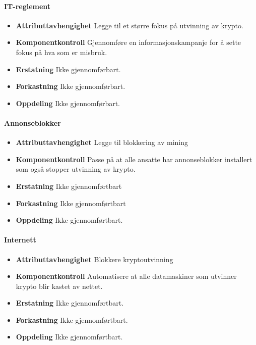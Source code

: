 \paragraph{IT-reglement}
\begin{itemize}
    \item \textbf{Attributtavhengighet} Legge til et større fokus på utvinning av krypto.
    \item \textbf{Komponentkontroll} Gjennomføre en informasjonskampanje for å sette fokus på hva som er misbruk.
    \item \textbf{Erstatning} Ikke gjennomførbart.
    \item \textbf{Forkastning} Ikke gjennomførbart.
    \item \textbf{Oppdeling} Ikke gjennomførbart. 
\end{itemize}

\paragraph{Annonseblokker}
\begin{itemize}
    \item \textbf{Attributtavhengighet} Legge til blokkering av mining 
    \item \textbf{Komponentkontroll} Passe på at alle ansatte har annonseblokker installert som også stopper utvinning av krypto.
    \item \textbf{Erstatning} Ikke gjennomførtbart
    \item \textbf{Forkastning} Ikke gjennomførtbart
    \item \textbf{Oppdeling} Ikke gjennomførtbart.
\end{itemize}

\paragraph{Internett}
\begin{itemize}
    \item \textbf{Attributtavhengighet} Blokkere kryptoutvinning
    \item \textbf{Komponentkontroll} Automatisere at alle datamaskiner som utvinner krypto blir kastet av nettet.
    \item \textbf{Erstatning} Ikke gjennomførtbart.
    \item \textbf{Forkastning} Ikke gjennomførtbart.
    \item \textbf{Oppdeling} Ikke gjennomførtbart.
\end{itemize}


